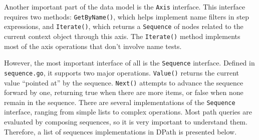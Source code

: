 \documentclass{article}
\begin{document}
Another important part of the data model is the \texttt{Axis} interface. This
interface requires two methods: \texttt{GetByName()}, which helps implement name
filters in step expressions, and \texttt{Iterate()}, which returns a
\texttt{Sequence} of nodes related to the current context object through this
axis. The \texttt{Iterate()} method implements most of the axis operations that
don't involve name tests.

However, the most important interface of all is the \texttt{Sequence} interface.
Defined in \texttt{sequence.go}, it supports two major operations.
\texttt{Value()} returns the current value ``pointed at'' by the sequence.
\texttt{Next()} attempts to advance the sequence forward by one, returning true
when there are more items, or false when none remain in the sequence. There are
several implementations of the \texttt{Sequence} interface, ranging from simple
lists to complex operations. Most path queries are evaluated by composing
sequences, so it is very important to understand them. Therefore, a list of
sequences implementations in DPath is presented below.
\end{document}
